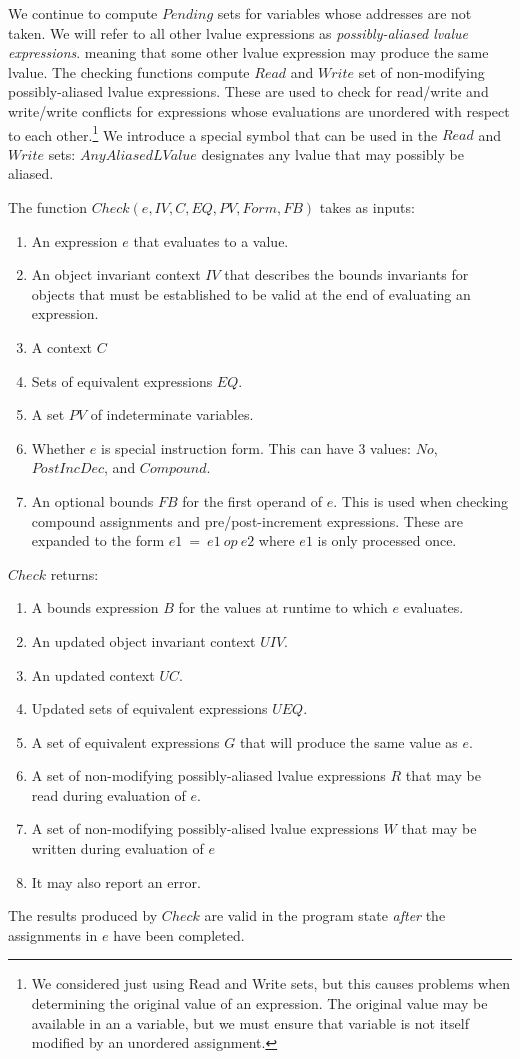 We continue to compute $Pending$ sets for variables whose addresses are not taken.
We will refer to all other lvalue expressions as {\em possibly-aliased lvalue expressions}.
meaning that some other lvalue expression may produce the same lvalue.
The checking functions compute $Read$ and $Write$ set of non-modifying
possibly-aliased lvalue expressions. These are used  to
check for read/write and write/write conflicts for expressions whose
evaluations are unordered with respect to each other.\footnote{We considered just
using Read and Write sets, but this causes problems when determining the
original value of an expression.  The original value may be available in 
an a variable, but we must ensure that variable is not itself modified 
by an unordered assignment.}
We introduce a special symbol that can be used in the $Read$ and $Write$ 
sets: $AnyAliasedLValue$ designates any lvalue that may possibly be aliased.

The function $Check(e, IV, C, EQ, PV, Form, FB)$ takes as inputs:
\begin{enumerate}
\item An expression $e$ that evaluates to a value.
\item An object invariant context $IV$ that describes the bounds invariants for objects
that must be established to be valid at the end of evaluating an expression.
\item A context $C$
\item Sets of equivalent expressions $EQ$.
\item A set $PV$ of indeterminate variables.
\item Whether $e$ is special instruction form.  This can have 3 values: $No$, $PostIncDec$,
and $Compound$.
\item An optional bounds $FB$ for the first operand of $e$.  
This is used when checking compound assignments and pre/post-increment expressions.  These are
expanded to the form $e1~=~e1~op~e2$ where $e1$ is only processed once. 
\end{enumerate}

$Check$ returns:
\begin{enumerate}
\item A bounds expression $B$ for the values at runtime to which $e$ evaluates.
\item An updated object invariant context $UIV$.
\item An updated context $\mathit{UC}$.
\item Updated sets of equivalent expressions $UEQ$.
\item A set of equivalent expressions $G$ that will produce the same value as $e$. 
\item A set of non-modifying possibly-aliased lvalue expressions $R$ that may be read during evaluation of 
        $e$.
\item A set of non-modifying possibly-alised lvalue expressions $W$ that may be written during evaluation 
        of $e$
\item It may also report an error.
\end{enumerate}
The results produced by $Check$ are valid in the program state
{\em after} the assignments in $e$ have been completed.

